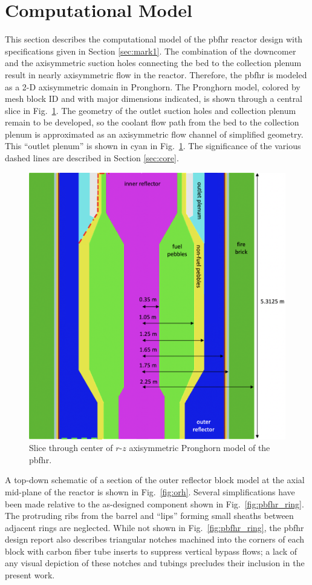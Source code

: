 \section{Computational Model}
\label{sec:pbfhr_model}

This section describes the computational model of the \gls{pbfhr} reactor design with specifications given in Section \ref{sec:mark1}. The combination of the downcomer and the axisymmetric suction holes connecting the bed to the collection plenum result in nearly axisymmetric flow in the reactor. Therefore, the \gls{pbfhr} is modeled as a 2-D axisymmetric domain in Pronghorn. The Pronghorn model, colored by mesh block ID and with major dimensions indicated, is shown through a central slice in Fig.\ \ref{fig:pbfhr_slice}. The geometry of the outlet suction holes and collection plenum remain to be developed, so the coolant flow path from the bed to the collection plenum is approximated as an axisymmetric flow channel of simplified geometry. This ``outlet plenum'' is shown in cyan in Fig.\ \ref{fig:pbfhr_slice}. The significance of the various dashed lines are described in Section \ref{sec:core}.

\begin{figure}[h!]
\centering
\hspace{1cm}
\includegraphics[width=0.5\linewidth]{figs/pbfhr_slice.png}
\caption{Slice through center of $r$-$z$ axisymmetric Pronghorn model of the \gls{pbfhr}.}
\label{fig:pbfhr_slice}
\end{figure}

A top-down schematic of a section of the outer reflector block model at the axial mid-plane of the reactor is shown in Fig.\ \ref{fig:orh}. Several simplifications have been made relative to the as-designed component shown in Fig.\ \ref{fig:pbfhr_ring}. The protruding ribs from the barrel and ``lips'' forming small sheaths between adjacent rings are neglected. While not shown in Fig.\ \ref{fig:pbfhr_ring}, the \gls{pbfhr} design report also describes triangular notches machined into the corners of each block with carbon fiber tube inserts to suppress vertical bypass flows; a lack of any visual depiction of these notches and tubings precludes their inclusion in the present work. 

